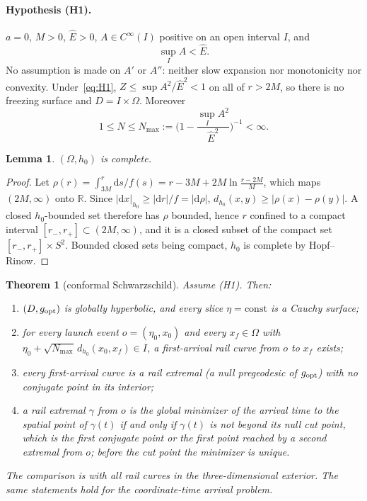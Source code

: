 \documentclass[aip,jmp,amsmath,amssymb,reprint]{revtex4-2}
\newcommand{\Ehat}{\hat E}
\newcommand{\dd}{\mathrm{d}}
\newcommand{\gopt}{g_{\rm opt}}
\theoremstyle{plain}
\newtheorem{theorem}{Theorem}
\newtheorem{lemma}[proposition]{Lemma}
\theoremstyle{definition}
\begin{document}
\paragraph{Hypothesis (H1).} $a=0$, $M>0$, $\Ehat>0$, $A\in C^\infty(I)$ positive on an
open interval $I$, and
\begin{equation}
  \sup_I A<\Ehat .
  \label{eq:H1}
\end{equation}
No assumption is made on $A'$ or $A''$: neither slow expansion nor monotonicity nor
convexity. Under~\eqref{eq:H1}, $Z\le\sup A^2/\Ehat^2<1$ on all of $r>2M$, so there is no
freezing surface and $D=I\times\Omega$. Moreover
\begin{equation}
  1\le N\le N_{\max}:=\Big(1-\frac{\sup_IA^2}{\Ehat^2}\Big)^{-1}<\infty .
  \label{eq:Nbounds}
\end{equation}

\begin{lemma}\label{lem:h0-complete}
$(\Omega,h_0)$ is complete.
\end{lemma}

\begin{proof}
Let $\rho(r)=\int_{3M}^r\dd s/f(s)=r-3M+2M\ln\frac{r-2M}{M}$, which maps $(2M,\infty)$
onto $\mathbb R$. Since $|\dd x|_{h_0}\ge|\dd r|/f=|\dd\rho|$,
$d_{h_0}(x,y)\ge|\rho(x)-\rho(y)|$. A closed $h_0$-bounded set therefore has $\rho$ bounded,
hence $r$ confined to a compact interval $[r_-,r_+]\subset(2M,\infty)$, and it is a
closed subset of the compact set $[r_-,r_+]\times S^2$. Bounded closed sets being
compact, $h_0$ is complete by Hopf--Rinow.
\end{proof}

\begin{theorem}[conformal Schwarzschild]\label{thm:schw}
Assume (H1). Then:
\begin{enumerate}
\item $(D,\gopt)$ is globally hyperbolic, and every slice $\eta=\mathrm{const}$ is a
  Cauchy surface;
\item for every launch event $o=(\eta_0,x_0)$ and every $x_f\in\Omega$ with
  $\eta_0+\sqrt{N_{\max}}\,d_{h_0}(x_0,x_f)\in I$, a first-arrival rail curve from $o$ to
  $x_f$ exists;
\item every first-arrival curve is a rail extremal (a null pregeodesic of $\gopt$) with
  no conjugate point in its interior;
\item a rail extremal $\gamma$ from $o$ is the global minimizer of the arrival time to the
  spatial point of $\gamma(t)$ if and only if $\gamma(t)$ is not beyond its null cut point,
  which is the first conjugate point or the first point reached by a second extremal
  from $o$; before the cut point the minimizer is unique.
\end{enumerate}
The comparison is with all rail curves in the three-dimensional exterior. The same
statements hold for the coordinate-time arrival problem.
\end{theorem}
\end{document}
